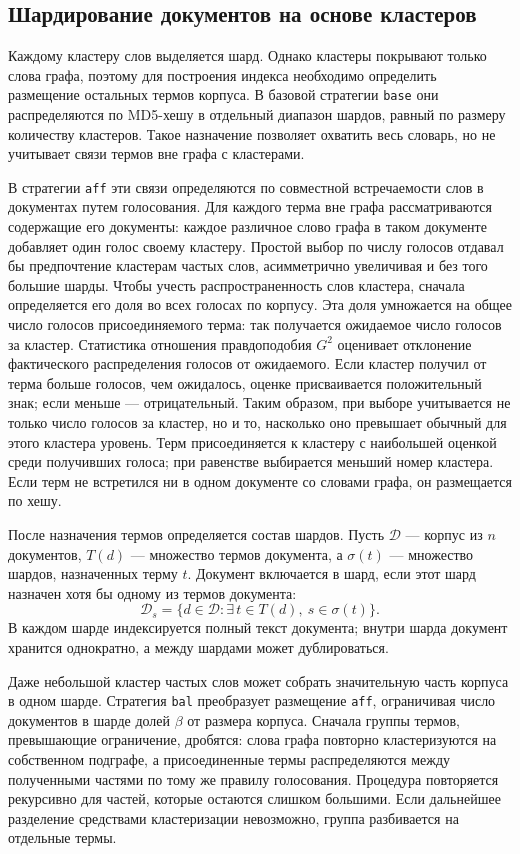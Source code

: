 \documentclass[10pt, a4paper, twoside]{article}
\newcommand{\strategy}[1]{\texttt{#1}}
\begin{document}
\begin{ntvbody}
\subsection{Шардирование документов на основе кластеров}
Каждому кластеру слов выделяется шард.
Однако кластеры покрывают только слова графа, поэтому для построения индекса необходимо определить размещение остальных термов корпуса.
В базовой стратегии \strategy{base} они распределяются по MD5-хешу в отдельный диапазон шардов, равный по размеру количеству кластеров.
Такое назначение позволяет охватить весь словарь, но не учитывает связи термов вне графа с кластерами.

В стратегии \strategy{aff} эти связи определяются по совместной встречаемости слов в документах путем голосования.
Для каждого терма вне графа рассматриваются содержащие его документы: каждое различное слово графа в таком документе добавляет один голос своему кластеру.
Простой выбор по числу голосов отдавал бы предпочтение кластерам частых слов, асимметрично увеличивая и без того большие шарды.
Чтобы учесть распространенность слов кластера, сначала определяется его доля во всех голосах по корпусу.
Эта доля умножается на общее число голосов присоединяемого терма: так получается ожидаемое число голосов за кластер.
Статистика отношения правдоподобия $G^2$ оценивает отклонение фактического распределения голосов от ожидаемого.
Если кластер получил от терма больше голосов, чем ожидалось, оценке присваивается положительный знак; если меньше --- отрицательный.
Таким образом, при выборе учитывается не только число голосов за кластер, но и то, насколько оно превышает обычный для этого кластера уровень.
Терм присоединяется к кластеру с наибольшей оценкой среди получивших голоса; при равенстве выбирается меньший номер кластера.
Если терм не встретился ни в одном документе со словами графа, он размещается по хешу.

После назначения термов определяется состав шардов.
Пусть $\mathcal D$ --- корпус из $n$ документов, $T(d)$ --- множество термов документа, а $\sigma(t)$ --- множество шардов, назначенных терму $t$.
Документ включается в шард, если этот шард назначен хотя бы одному из термов документа:
\begin{equation}
 \mathcal D_s=\{d\in\mathcal D:\exists\,t\in T(d),\ s\in\sigma(t)\}.
 \label{eq:storage}
\end{equation}
В каждом шарде индексируется полный текст документа; внутри шарда документ хранится однократно, а между шардами может дублироваться.

Даже небольшой кластер частых слов может собрать значительную часть корпуса в одном шарде.
Стратегия \strategy{bal} преобразует размещение \strategy{aff}, ограничивая число документов в шарде долей $\beta$ от размера корпуса.
Сначала группы термов, превышающие ограничение, дробятся: слова графа повторно кластеризуются на собственном подграфе, а присоединенные термы распределяются между полученными частями по тому же правилу голосования.
Процедура повторяется рекурсивно для частей, которые остаются слишком большими.
Если дальнейшее разделение средствами кластеризации невозможно, группа разбивается на отдельные термы.


\end{ntvbody}
\end{document}
